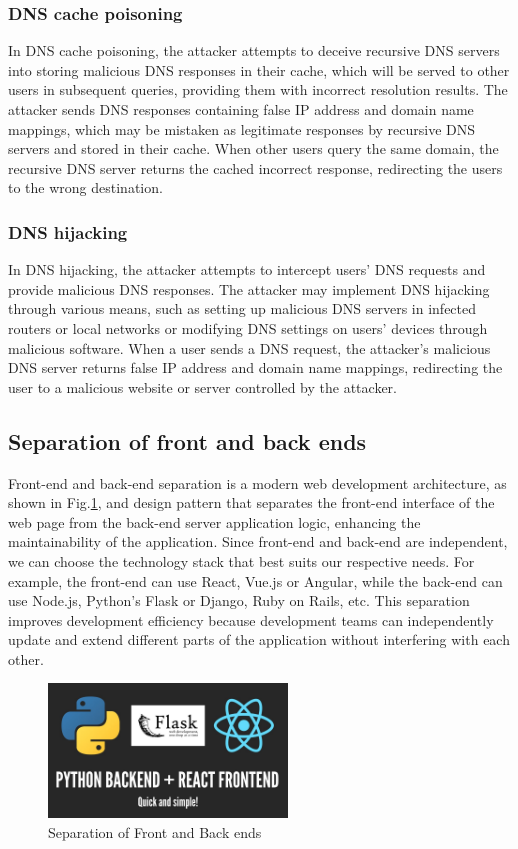 \documentclass[journal]{IEEEtran}
\begin{document}
\subsubsection{DNS cache poisoning}
In DNS cache poisoning, the attacker attempts to deceive recursive DNS servers into storing malicious DNS responses in their cache, which will be served to other users in subsequent queries, providing them with incorrect resolution results. The attacker sends DNS responses containing false IP address and domain name mappings, which may be mistaken as legitimate responses by recursive DNS servers and stored in their cache. When other users query the same domain, the recursive DNS server returns the cached incorrect response, redirecting the users to the wrong destination.

\subsubsection{DNS hijacking}
In DNS hijacking, the attacker attempts to intercept users' DNS requests and provide malicious DNS responses. The attacker may implement DNS hijacking through various means, such as setting up malicious DNS servers in infected routers or local networks or modifying DNS settings on users' devices through malicious software. When a user sends a DNS request, the attacker's malicious DNS server returns false IP address and domain name mappings, redirecting the user to a malicious website or server controlled by the attacker.

\subsection{Separation of front and back ends}
Front-end and back-end separation is a modern web development architecture, as shown in Fig.\ref{fig:Separation}, and design pattern that separates the front-end interface of the web page from the back-end server application logic, enhancing the maintainability of the application. Since front-end and back-end are independent, we can choose the technology stack that best suits our respective needs. For example, the front-end can use React, Vue.js or Angular, while the back-end can use Node.js, Python's Flask or Django, Ruby on Rails, etc. This separation improves development efficiency because development teams can independently update and extend different parts of the application without interfering with each other.

\begin{figure}[h]
  \centering
  \includegraphics[width=2.5in]{figures/Preliminaries1.png}
  \caption{Separation of Front and Back ends}
  \label{fig:Separation}
  \end{figure}
\end{document}
